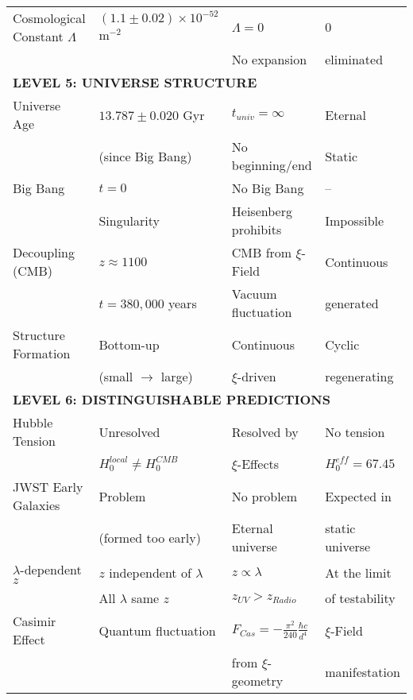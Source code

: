 \documentclass[12pt,a4paper]{article}
\begin{document}
\begin{longtable}{p{4.5cm}p{3.5cm}p{3.5cm}p{3.5cm}}
		Cosmological Constant $\Lambda$ & $(1.1 \pm 0.02) \times 10^{-52}$ m$^{-2}$ & $\Lambda = 0$ & $0$ \\
		& & No expansion & eliminated \\[0.3em]
		
		\midrule
		\multicolumn{4}{l}{\textbf{LEVEL 5: UNIVERSE STRUCTURE}} \\
		\midrule
		
		Universe Age & $13.787 \pm 0.020$ Gyr & $t_{univ} = \infty$ & Eternal \\
		& (since Big Bang) & No beginning/end & Static \\[0.3em]
		
		Big Bang & $t = 0$ & No Big Bang & -- \\
		& Singularity & Heisenberg prohibits & Impossible \\[0.3em]
		
		Decoupling (CMB) & $z \approx 1100$ & CMB from $\xi$-Field & Continuous \\
		& $t = 380,000$ years & Vacuum fluctuation & generated \\[0.3em]
		
		Structure Formation & Bottom-up & Continuous & Cyclic \\
		& (small $\to$ large) & $\xi$-driven & regenerating \\[0.3em]
		
		\midrule
		\multicolumn{4}{l}{\textbf{LEVEL 6: DISTINGUISHABLE PREDICTIONS}} \\
		\midrule
		
		Hubble Tension & Unresolved & Resolved by & No tension \\
		& $H_0^{local} \neq H_0^{CMB}$ & $\xi$-Effects & $H_0^{eff} = 67.45$ \\[0.3em]
		
		JWST Early Galaxies & Problem & No problem & Expected in \\
		& (formed too early) & Eternal universe & static universe \\[0.3em]
		
		$\lambda$-dependent $z$ & $z$ independent of $\lambda$ & $z \propto \lambda$ & At the limit \\
		& All $\lambda$ same $z$ & $z_{UV} > z_{Radio}$ & of testability \\[0.3em]
		
		Casimir Effect & Quantum fluctuation & $F_{Cas} = -\frac{\pi^2}{240} \frac{\hbar c}{d^4}$ & $\xi$-Field \\
		& & from $\xi$-geometry & manifestation \\[0.3em]
		

\end{longtable}
\end{document}
